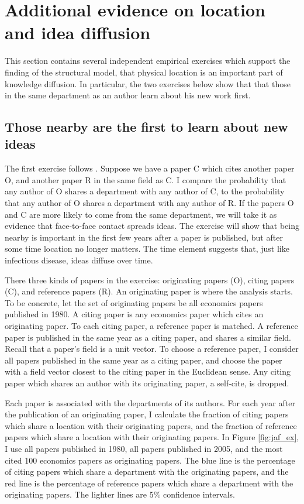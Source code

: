 \section{Additional evidence on location and idea diffusion}
\label{sec:add_evid}

This section contains several independent empirical exercises which
support the finding of the structural model, that physical location is
an important part of knowledge diffusion. In particular, the two
exercises below show that that those in the same department as an author
learn about his new work first.

\subsection{Those nearby are the first to learn about new ideas}

The first exercise follows \citet{jaffe1993geographic}. Suppose we have 
a paper C which cites another paper O, and another paper R in the same
field as C.  I compare the probability that any author of O shares a
department with any author of C, to the probability that any author of O
shares a department with any author of R.  If the papers O and C are more likely
to come from the same department, we will take it as evidence that
face-to-face contact spreads ideas. The exercise will show that being
nearby is important in the first few years after a paper is published,
but after some time location no longer matters. The time element
suggests that, just like infectious disease, ideas diffuse over time.

There three kinds of papers in the exercise: originating papers (O), citing
papers (C), and reference papers (R). An originating paper is where the analysis
starts. To be concrete, let the set of originating papers be all
economics papers published in 1980. A citing paper is any economics
paper which cites an originating paper. To each citing paper, a
reference paper is matched. A reference paper is published in the same
year as a citing paper, and shares a similar field. Recall that a
paper's field is a unit vector. To choose a reference paper, I consider
all papers published in the same year as a citing paper, and choose the
paper with a field vector closest to the citing paper in the Euclidean
sense. Any citing paper which shares an author with its originating
paper, a self-cite, is dropped.

Each paper is associated with the departments of its authors. For each
year after the publication of an originating paper, I calculate the
fraction of citing papers which share a location with their originating
papers, and the fraction of reference papers which share a location with
their originating papers. In Figure \ref{fig:jaf_ex}, I use all papers published in
1980, all papers published in 2005, and the most cited 100 economics
papers as originating papers. The blue line is the percentage of citing
papers which share a department with the originating papers, and the red
line is the percentage of reference papers which share a department with
the originating papers. The lighter lines are 5\% confidence intervals.

